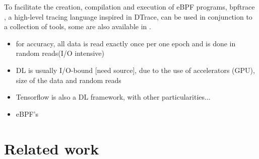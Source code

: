 \documentclass[conference]{IEEEtran}
\begin{document}
    To facilitate the creation, compilation and execution of eBPF programs, bpftrace \cite{bpftrace}, a high-level tracing language inspired in DTrace, can be used in conjunction to a collection of tools, some are also available in \cite{bgreggBook}.
\begin{itemize}
    \item for accuracy, all data is read exactly once per one epoch and is done in random reads(I/O intensive)
    \item DL is usually I/O-bound [need source], due to the use of accelerators (GPU), size of the data and random reads
    \item Tensorflow is also a DL framework, with other particularities...
    \item eBPF's
\end{itemize}

\section{Related work}
\end{document}

